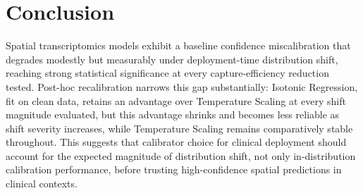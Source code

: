 \documentclass[pmlr,twocolumn,10pt]{jmlr} %
\begin{document}
\section{Conclusion}
\label{sec:conclusion}
Spatial transcriptomics models exhibit a baseline confidence miscalibration that degrades modestly but measurably under deployment-time distribution shift, reaching strong statistical significance at every capture-efficiency reduction tested. Post-hoc recalibration narrows this gap substantially: Isotonic Regression, fit on clean data, retains an advantage over Temperature Scaling at every shift magnitude evaluated, but this advantage shrinks and becomes less reliable as shift severity increases, while Temperature Scaling remains comparatively stable throughout. This suggests that calibrator choice for clinical deployment should account for the expected magnitude of distribution shift, not only in-distribution calibration performance, before trusting high-confidence spatial predictions in clinical contexts.


\end{document}
